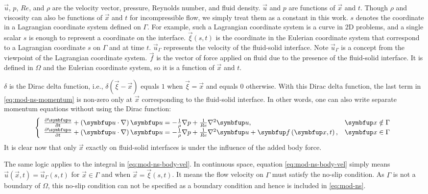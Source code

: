 $\vec{u}$, $p$, $Re$, and $\rho$ are the velocity vector, pressure, Reynolds number, and fluid density.
$\vec{u}$ and $p$ are functions of $\vec{x}$ and $t$.
Though $\rho$ and viscosity can also be functions of $\vec{x}$ and $t$ for incompressible flow, we simply treat them as a constant in this work.
$s$ denotes the coordinate in a Lagrangian coordinate system defined on $\Gamma$.
For example, such a Lagrangian coordinate system is a curve in 2D problems, and a single scalar $s$ is enough to represent a coordinate on the interface.
$\vec{\xi}(s, t)$ is the coordinate in the Eulerian coordinate system that correspond to a Lagrangian coordinate $s$ on $\Gamma$ and at time $t$.
$\vec{u}_\Gamma$ represents the velocity of the fluid-solid interface.
Note $\vec{u}_\Gamma$ is a concept from the viewpoint of the Lagrangian coordinate system.
$\vec{f}$ is the vector of force applied on fluid due to the presence of the fluid-solid interface.
It is defined in $\Omega$ and the Eulerian coordinate system, so it is a function of $\vec{x}$ and $t$.

$\delta$ is the Dirac delta function, i.e., $\delta(\vec{\xi}-\vec{x})$ equals $1$ when $\vec{\xi} = \vec{x}$ and equals $0$ otherwise.
With this Dirac delta function, the last term in \eqref{eq:mod-ns-momentum} is non-zero only at $\vec{x}$ corresponding to the fluid-solid interface.
In other words, one can also write separate momentum equations without using the Dirac function:
\begin{equation}
\left\{
    \begin{array}{ll}
        \pdiff{\vec{u}}{t} + \left(\vec{u} \cdot \nabla\right) \vec{u}
            = -\frac{1}{\rho}\nabla p + \frac{1}{Re} \nabla^2 \vec{u}\text{,} & \vec{x} \notin \Gamma \\
        \pdiff{\vec{u}}{t} + \left(\vec{u} \cdot \nabla\right) \vec{u}
            = -\frac{1}{\rho}\nabla p + \frac{1}{Re} \nabla^2 \vec{u} + \vec{f}\left(\vec{x}, t \right)\text{,} & \vec{x} \in \Gamma \\
    \end{array}
\right. 
\end{equation}
It is clear now that only $\vec{x}$ exactly on fluid-solid interfaces is under the influence of the added body force.

The same logic applies to the integral in \eqref{eq:mod-ns-body-vel}.
In continuous space, equation \eqref{eq:mod-ns-body-vel} simply means $\vec{u}\left(\vec{x}, t\right)=\vec{u}_\Gamma\left(s, t\right)$ for $\vec{x} \in \Gamma$ and when $\vec{x}=\vec{\xi}\left(s, t\right)$.
It means the flow velocity on $\Gamma$ must satisfy the no-slip condition.
As $\Gamma$ is not a boundary of $\Omega$, this no-slip condition can not be specified as a boundary condition and hence is included in \eqref{eq:mod-ns}.

